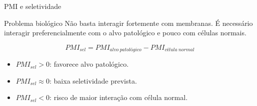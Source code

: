 \documentclass[aspectratio=169,10pt]{beamer}
\begin{document}
\begin{frame}{PMI e seletividade}
\begin{block}{Problema biológico}
Não basta interagir fortemente com membranas. É necessário interagir preferencialmente com o alvo patológico e pouco com células normais.
\end{block}

\vspace{0.2cm}
\begin{equation*}
PMI_{sel} = PMI_{alvo\ patológico} - PMI_{célula\ normal}
\end{equation*}

\vspace{0.1cm}
\begin{center}
\end{center}

\vspace{0.1cm}
\begin{itemize}
  \item $PMI_{sel} > 0$: favorece alvo patológico.
  \item $PMI_{sel} \approx 0$: baixa seletividade prevista.
  \item $PMI_{sel} < 0$: risco de maior interação com célula normal.
\end{itemize}
\end{frame}
\end{document}
